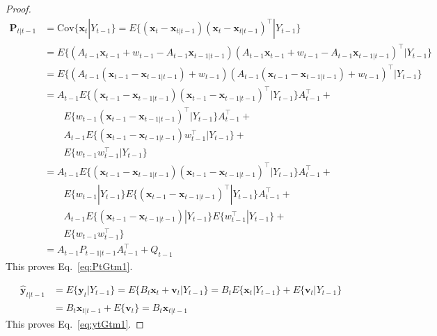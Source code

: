 \documentclass[12pt]{article}
\begin{document}
\begin{proof}
    \begin{align}
        \mathbf{P}_{t|t-1}&=\text{Cov}\{\mathbf{x}_t|Y_{t-1}\}=E\{(\mathbf{x}_t-\mathbf{x}_{t|t-1})(\mathbf{x}_t-\mathbf{x}_{t|t-1})^\intercal|Y_{t-1}\}\nonumber\\
                          &=E\{\left(A_{t-1}\mathbf{x}_{t-1}+w_{t-1}-A_{t-1}\mathbf{x}_{t-1|t-1}\right)\left(A_{t-1}\mathbf{x}_{t-1}+w_{t-1}-A_{t-1}\mathbf{x}_{t-1|t-1}\right)^\intercal|Y_{t-1}\}\nonumber\\
                          &=E\{\left(A_{t-1}(\mathbf{x}_{t-1}-\mathbf{x}_{t-1|t-1})+w_{t-1}\right)\left(A_{t-1}(\mathbf{x}_{t-1}-\mathbf{x}_{t-1|t-1})+w_{t-1}\right)^\intercal|Y_{t-1}\}\nonumber\\
                          &=A_{t-1}E\{(\mathbf{x}_{t-1}-\mathbf{x}_{t-1|t-1})(\mathbf{x}_{t-1}-\mathbf{x}_{t-1|t-1})^\intercal|Y_{t-1}\}A_{t-1}^\intercal+\nonumber\\
                          &\qquad E\{w_{t-1}(\mathbf{x}_{t-1}-\mathbf{x}_{t-1|t-1})^\intercal|Y_{t-1}\}A_{t-1}^\intercal+\nonumber\\
                          &\qquad A_{t-1}E\{(\mathbf{x}_{t-1}-\mathbf{x}_{t-1|t-1})w_{t-1}^\intercal|Y_{t-1}\}+\nonumber\\
                          &\qquad E\{w_{t-1}w_{t-1}^\intercal|Y_{t-1}\}\nonumber\\
                          &=A_{t-1}E\{(\mathbf{x}_{t-1}-\mathbf{x}_{t-1|t-1})(\mathbf{x}_{t-1}-\mathbf{x}_{t-1|t-1})^\intercal|Y_{t-1}\}A_{t-1}^\intercal+\nonumber\\
                          &\qquad E\{w_{t-1}|Y_{t-1}\}E\{(\mathbf{x}_{t-1}-\mathbf{x}_{t-1|t-1})^\intercal|Y_{t-1}\}A_{t-1}^\intercal+\nonumber\\
                          &\qquad A_{t-1}E\{(\mathbf{x}_{t-1}-\mathbf{x}_{t-1|t-1})|Y_{t-1}\}E\{w_{t-1}^\intercal|Y_{t-1}\}+\nonumber\\
                          &\qquad E\{w_{t-1}w_{t-1}^\intercal\}\label{eq:p1n2}\\
                          &=A_{t-1}P_{t-1|t-1}A_{t-1}^\intercal+Q_{t-1}\label{eq:p1n3}
    \end{align}
	This proves Eq.~\ref{eq:PtGtm1}.

    \begin{align}
        \hat{\mathbf{y}}_{t|t-1}&=E\{\mathbf{y}_t|Y_{t-1}\}=E\{B_t\mathbf{x}_t+\mathbf{v}_t|Y_{t-1}\}=B_tE\{\mathbf{x}_t|Y_{t-1}\}+E\{\mathbf{v}_t|Y_{t-1}\}\nonumber\\
                                &=B_t\mathbf{x}_{t|t-1}+E\{\mathbf{v}_t\}=B_t\mathbf{x}_{t|t-1}\nonumber
    \end{align}
	This proves Eq.~\ref{eq:ytGtm1}.


\end{proof}
\end{document}

